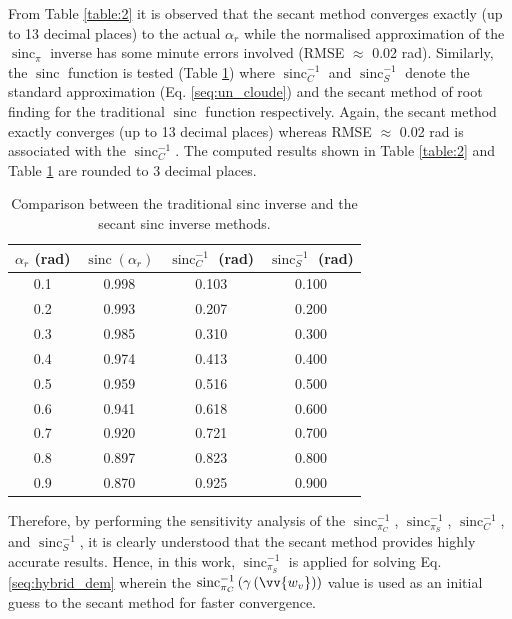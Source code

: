 \documentclass[12pt]{elsarticle}
\numberwithin{equation}{section}
\numberwithin{figure}{section}
\numberwithin{table}{section}
\DeclareMathOperator{\sinc}{sinc}
\begin{document}
From Table \ref{table:2} it is observed that the secant method converges exactly (up to 13 decimal places) to the
actual $\alpha_r$ while the normalised \cite{Cloude2010} approximation of the $\sinc_\pi$ inverse has some minute errors
involved (RMSE $\approx$ 0.02 rad). Similarly, the $\sinc$ function is tested (Table \ref{table:3}) where $\sinc_C^{-1}$ and $\sinc_S^{-1}$ denote the standard \cite{Cloude2010} approximation (Eq. \eqref{seq:un_cloude}) and the secant method of root finding for the traditional $\sinc$ function respectively. Again, the secant method exactly converges (up to 13 decimal places) whereas RMSE $\approx$ 0.02 rad is associated with the $\sinc_C^{-1}$. The computed results shown in Table \ref{table:2} and Table \ref{table:3} are rounded to 3 decimal places.

\begin{table}[ht]
\centering
\caption{\doublespacing Comparison between the traditional \cite{Cloude2010} sinc inverse and the secant sinc inverse methods.}
\label{table:3}
\begin{tabular}{c c c c}
\hline
\boldmath$\alpha_r$ \textbf{(rad)} & \boldmath$\sinc\left(\alpha_r\right)$   & \boldmath$\sinc_C^{-1}$ \textbf{(rad)}     & \boldmath$\sinc_S^{-1}$ \textbf{(rad)} \\ \hline
0.1                 & 0.998            & 0.103          & 0.100  \\ 
0.2                 & 0.993            & 0.207          & 0.200  \\ 
0.3                 & 0.985            & 0.310          & 0.300  \\ 
0.4                 & 0.974            & 0.413          & 0.400  \\ 
0.5                 & 0.959            & 0.516          & 0.500   \\ 
0.6                 & 0.941            & 0.618          & 0.600  \\ 
0.7                 & 0.920            & 0.721          & 0.700   \\ 
0.8                 & 0.897            & 0.823          & 0.800 \\ 
0.9                 & 0.870            & 0.925          & 0.900 \\ \hline

\end{tabular}
\end{table}

Therefore, by performing the sensitivity analysis of the $\sinc_{\pi_C}^{-1}$, $\sinc_{\pi_S}^{-1}$, $\sinc_C^{-1}$, and $\sinc_S^{-1}$, it is clearly understood that the secant method provides highly accurate results. Hence, in this work, $\sinc_{\pi_S}^{-1}$ is applied for solving Eq. \eqref{seq:hybrid_dem} wherein the $\sinc_{\pi_C}^{-1}\left(\gamma\left(\vv{w_v}\right)\right)$ value is used as an initial guess to the secant method for faster convergence.
\end{document}
